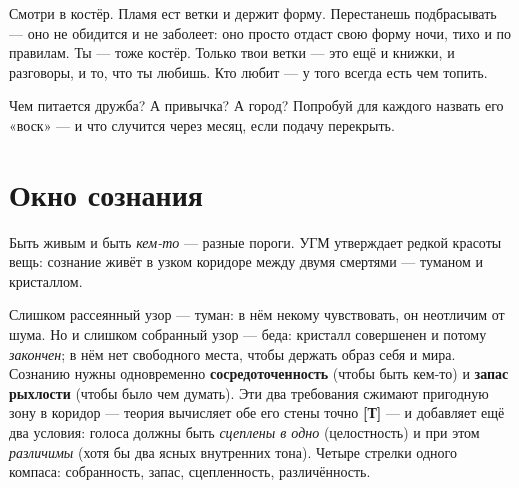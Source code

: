 \documentclass[11pt,letterpaper]{article}
\newcommand{\stT}{\textbf{[Т]}\xspace}
\begin{document}
\begin{skazbox}
Смотри в костёр. Пламя ест ветки и держит форму. Перестанешь
подбрасывать --- оно не обидится и не заболеет: оно просто отдаст
свою форму ночи, тихо и по правилам. Ты --- тоже костёр. Только
твои ветки --- это ещё и книжки, и разговоры, и то, что ты любишь.
Кто любит --- у того всегда есть чем топить.
\end{skazbox}

\begin{askbox}
Чем питается дружба? А привычка? А город? Попробуй для каждого
назвать его «воск» --- и что случится через месяц, если подачу
перекрыть.
\end{askbox}

\section{Окно сознания}
\label{sec:window}

Быть живым и быть \emph{кем-то} --- разные пороги. УГМ утверждает
редкой красоты вещь: сознание живёт в узком коридоре между двумя
смертями --- туманом и кристаллом.

Слишком рассеянный узор --- туман: в нём некому чувствовать, он
неотличим от шума. Но и слишком собранный узор --- беда: кристалл
совершенен и потому \emph{закончен}; в нём нет свободного места,
чтобы держать образ себя и мира. Сознанию нужны одновременно
\textbf{сосредоточенность} (чтобы быть кем-то) и \textbf{запас
рыхлости} (чтобы было чем думать). Эти два требования сжимают
пригодную зону в коридор --- теория вычисляет обе его стены точно
\stT{} --- и добавляет ещё два условия: голоса должны быть
\emph{сцеплены в одно} (целостность) и при этом \emph{различимы}
(хотя бы два ясных внутренних тона). Четыре стрелки одного компаса:
собранность, запас, сцепленность, различённость.
\end{document}
